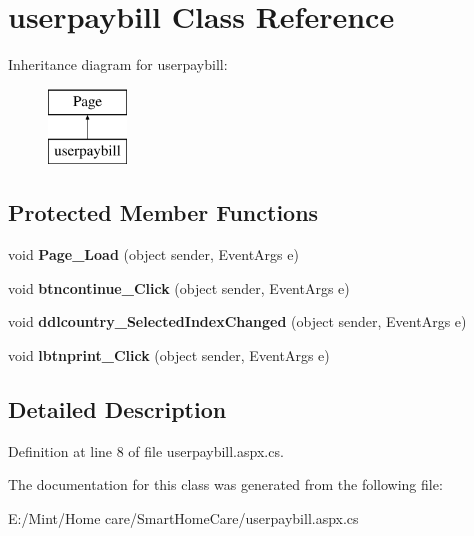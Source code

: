 \hypertarget{classuserpaybill}{\section{userpaybill Class Reference}
\label{classuserpaybill}
}
Inheritance diagram for userpaybill\-:\begin{figure}[H]
\begin{center}
\leavevmode
\includegraphics[height=2.000000cm]{classuserpaybill}
\end{center}
\end{figure}
\subsection*{Protected Member Functions}
\begin{DoxyCompactItemize}
\item 
\hypertarget{classuserpaybill_af3752c51efa020ea2d960f42c1b40b79}{void {\bfseries Page\-\_\-\-Load} (object sender, Event\-Args e)}\label{classuserpaybill_af3752c51efa020ea2d960f42c1b40b79}

\item 
\hypertarget{classuserpaybill_af290c6f29a7c4fbc8a32a332f6c31dc9}{void {\bfseries btncontinue\-\_\-\-Click} (object sender, Event\-Args e)}\label{classuserpaybill_af290c6f29a7c4fbc8a32a332f6c31dc9}

\item 
\hypertarget{classuserpaybill_a7863394c68dd1f4a431daa606d0befe9}{void {\bfseries ddlcountry\-\_\-\-Selected\-Index\-Changed} (object sender, Event\-Args e)}\label{classuserpaybill_a7863394c68dd1f4a431daa606d0befe9}

\item 
\hypertarget{classuserpaybill_af6bbe9beeea71396506c53376195a0e0}{void {\bfseries lbtnprint\-\_\-\-Click} (object sender, Event\-Args e)}\label{classuserpaybill_af6bbe9beeea71396506c53376195a0e0}

\end{DoxyCompactItemize}


\subsection{Detailed Description}


Definition at line 8 of file userpaybill.\-aspx.\-cs.



The documentation for this class was generated from the following file\-:\begin{DoxyCompactItemize}
\item 
E\-:/\-Mint/\-Home care/\-Smart\-Home\-Care/userpaybill.\-aspx.\-cs\end{DoxyCompactItemize}
